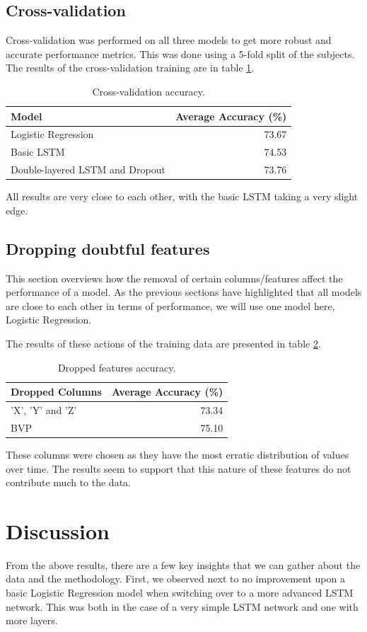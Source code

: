 \documentclass{article}
\begin{document}
\subsection{Cross-validation}
Cross-validation was performed on all three models to get more robust and accurate performance metrics. This was done using a 5-fold split of the subjects. The results of the cross-validation training are in table \ref{tab:crossvalidation}.

\begin{table}[h]
\centering
\begin{tabular}{l|r}
Model & Average Accuracy (\%) \\\hline
Logistic Regression & 73.67 \\
Basic LSTM & 74.53 \\
Double-layered LSTM and Dropout & 73.76
\end{tabular}
\caption{\label{tab:crossvalidation}Cross-validation accuracy.}
\end{table}

All results are very close to each other, with the basic LSTM taking a very slight edge. 

\subsection{Dropping doubtful features}
This section overviews how the removal of certain columns/features affect the performance of a model. As the previous sections have highlighted that all models are close to each other in terms of performance, we will use one model here, Logistic Regression.

The results of these actions of the training data are presented in table \ref{tab:droppedcolumns}.

\begin{table}[h]
\centering
\begin{tabular}{l|r}
Dropped Columns & Average Accuracy (\%) \\\hline
'X', 'Y' and 'Z' & 73.34 \\
BVP & 75.10
\end{tabular}
\caption{\label{tab:droppedcolumns}Dropped features accuracy.}
\end{table}

These columns were chosen as they have the most erratic distribution of values over time. The results seem to support that this nature of these features do not contribute much to the data.

\section{Discussion}
From the above results, there are a few key insights that we can gather about the data and the methodology. First, we observed next to no improvement upon a basic Logistic Regression model when switching over to a more advanced LSTM network. This was both in the case of a very simple LSTM network and one with more layers.
\end{document}
